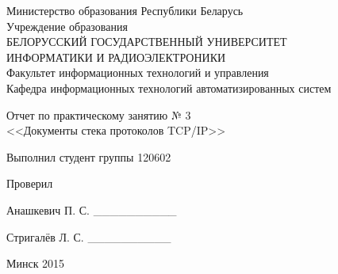 \thispagestyle{empty}
\setlength{\parindent}{0ex} %

\begin{center}
  Министерство образования Республики Беларусь \\
  \vspace{0.5ex}
  Учреждение образования \\
  БЕЛОРУССКИЙ ГОСУДАРСТВЕННЫЙ УНИВЕРСИТЕТ \\
  ИНФОРМАТИКИ И РАДИОЭЛЕКТРОНИКИ \\
  \vspace{0.5ex}
  Факультет информационных технологий и управления \\
  \vspace{0.5ex}
  Кафедра информационных технологий автоматизированных систем
\end{center}

\vspace{50mm}

\begin{center}
  Отчет по практическому занятию № 3 \\
  <<Документы стека протоколов TCP/IP>>
\end{center}

\vspace{55mm}

\begin{minipage}{.55\linewidth}
    Выполнил студент группы 120602

    \smallskip

    Проверил
\end{minipage}
\hfill
\begin{minipage}{.4\linewidth}
  \begin{flushright}
    Анашкевич П. С. \_\_\_\_\_\_\_\_\_\_

    \smallskip

    Стригалёв Л. С. \_\_\_\_\_\_\_\_\_\_
  \end{flushright}
\end{minipage}

\vspace{45mm}
\begin{center}
  Минск 2015
\end{center}

\setlength{\parindent}{1.25cm} %

\newpage
